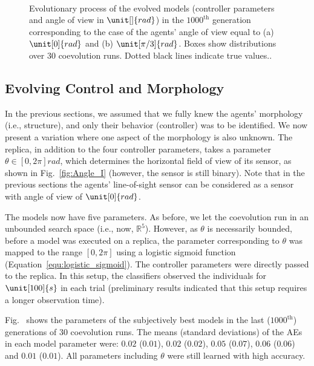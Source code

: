 \begin{figure}[!t]%
	\centering
		\\
		\caption{Evolutionary process of the evolved models (controller parameters and angle of view in $\unit[]{rad}$) in the $1000^\textrm{th}$ generation corresponding to the case of the agents' angle of view equal to (a) $\unit[0]{rad}$ and (b) $\unit[\pi/3]{rad}$. Boxes show distributions over $30$ coevolution runs. Dotted black lines indicate true values.. \label{fig:model_parameters_convergence_angleview}}
\end{figure}
%
\subsection{Evolving Control and Morphology}\label{sec:evolving_control_and_morphology_swarm_simulation}
In the previous sections, we assumed that we fully knew the agents' morphology (i.e., structure), and only their behavior (controller) was to be identified. We now present a variation where one aspect of the morphology is also unknown. The replica, in addition to the four controller parameters, takes a parameter $\theta\in\left[0,2\pi\right]\unit{rad}$, which determines the horizontal field of view of its sensor, as shown in Fig.~\ref{fig:Angle_I} (however, the sensor is still binary). Note that in the previous sections the agents' line-of-sight sensor can be considered as a sensor with angle of view of $\unit[0]{rad}$.

The models now have five parameters. As before, we let the coevolution run in an unbounded search space (i.e., now, $\mathbb{R}^5$). However, as $\theta$ is necessarily bounded, before a model was executed on a replica, the parameter corresponding to $\theta$ was mapped to the range $[0, 2\pi]$ using a logistic sigmoid function (Equation~\eqref{equ:logistic_sigmoid}). The controller parameters were directly passed to the replica. In this setup, the classifiers observed the individuals for $\unit[100]{s}$ in each trial (preliminary results indicated that this setup requires a longer observation time). 

Fig.~ shows the parameters of the subjectively best models in the last ($1000^\textrm{th}$) generations of $30$ coevolution runs. The means (standard deviations) of the AEs in each model parameter were: $0.02$ ($0.01$), $0.02$ ($0.02$), $0.05$ ($0.07$), $0.06$ ($0.06$) and $0.01$ ($0.01$). All parameters including $\theta$ were still learned with high accuracy.

